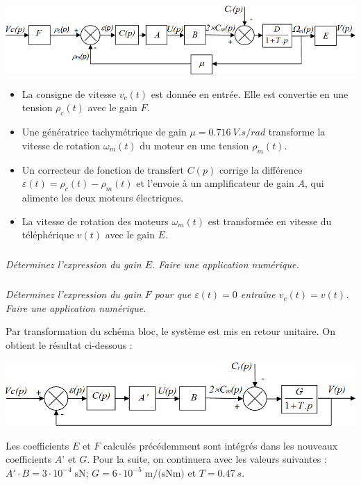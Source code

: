 \documentclass[10pt,fleqn]{article} %
\begin{document}
\begin{multicols}{2}
\begin{center}
	\includegraphics[width=\linewidth]{images2/fig_04}
\end{center}

\begin{itemize}
\item La consigne de vitesse $v_c(t)$ est donnée en entrée. Elle est convertie en une tension $\rho_c(t)$ avec le gain $F$.
\item Une génératrice tachymétrique de gain $\mu=\SI{0.716}{V.s/rad}$ transforme la vitesse de rotation $\omega_m(t)$ du moteur en une tension $\rho_m(t)$.
\item Un correcteur de fonction de transfert $C(p)$ corrige la différence $\varepsilon(t)=\rho_c(t)- \rho_m(t)$ et l’envoie à un amplificateur de gain $A$, qui alimente les deux moteurs électriques.
\item La vitesse de rotation des moteurs $\omega_m(t)$ est transformée en vitesse du téléphérique $v(t)$ avec le gain $E$.
\end{itemize}

\subparagraph{}
\textit{Déterminez l’expression du gain $E$. Faire une application numérique.}

\subparagraph{}
\textit{Déterminez l’expression du gain $F$ pour que $\varepsilon(t)=0$ entraîne $v_c(t)=v(t)$. Faire une application numérique.}

Par transformation du schéma bloc, le système est mis en retour unitaire. On obtient le résultat ci-dessous :
\begin{center}
	\includegraphics[width=\linewidth]{images2/fig_05}
\end{center}

	Les coefficients $E$ et $F$ calculés précédemment sont intégrés dans les nouveaux coefficients $A’$ et $G$. Pour la suite, on continuera avec les valeurs suivantes : $A'\cdot B=3\cdot 10^{-4}\;\text{sN}$; $G=6\cdot 10^{-5}\;\text{m/(sNm)}$ et $T=\SI{0,47}{s}$.
	

\end{multicols}
\end{document}
